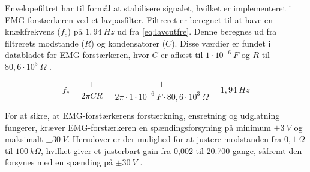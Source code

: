Envelopefiltret har til formål at stabilisere signalet, hvilket er implementeret i EMG-forstærkeren ved et lavpasfilter. 
Filtreret er beregnet til at have en knækfrekvens ($f_c$) på $1,94~Hz$ ud fra \autoref{eq:lavcutfre}. 
Denne  beregnes ud fra filtrerets modstande ($R$) og kondensatorer ($C$). 
Disse værdier er fundet i databladet for EMG-forstærkeren, hvor $C$ er aflæst til $1 \cdot 10^{-6}~F$ og $R$ til $80,6 \cdot 10^3~\Omega$ \citep{advancertech2013}. 

\begin{equation}\label{eq:lavcutfre}
f_c = \frac{1}{2 \pi C R} = \frac{1}{2 \pi \cdot 1 \cdot 10^{-6}~F \cdot 80,6 \cdot 10^3~\Omega} = 1,94~Hz
\end{equation}

\noindent
For at sikre, at EMG-forstærkerens forstærkning, ensretning og udglatning fungerer, kræver EMG-forstærkeren en spændingsforsyning på minimum $\pm 3~V$ og maksimalt $\pm 30~V$. Herudover er der mulighed for at justere modstanden fra $0,1~\Omega$ til $100~k\Omega$, hvilket giver et justerbart gain fra 0,002 til 20.700 gange, såfremt den forsynes med en spænding på $\pm 30~V$ \citep{advancertech2013}. 